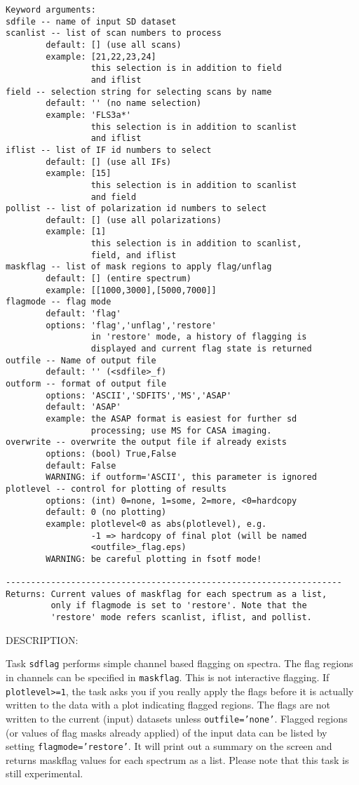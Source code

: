 \begin{verbatim}
Keyword arguments:
sdfile -- name of input SD dataset
scanlist -- list of scan numbers to process
        default: [] (use all scans)
        example: [21,22,23,24]
                 this selection is in addition to field
                 and iflist
field -- selection string for selecting scans by name
        default: '' (no name selection)
        example: 'FLS3a*'
                 this selection is in addition to scanlist
                 and iflist
iflist -- list of IF id numbers to select
        default: [] (use all IFs)
        example: [15]
                 this selection is in addition to scanlist
                 and field
pollist -- list of polarization id numbers to select
        default: [] (use all polarizations)
        example: [1]
                 this selection is in addition to scanlist,
                 field, and iflist
maskflag -- list of mask regions to apply flag/unflag 
        default: [] (entire spectrum)
        example: [[1000,3000],[5000,7000]]
flagmode -- flag mode
        default: 'flag'
        options: 'flag','unflag','restore'
                 in 'restore' mode, a history of flagging is 
                 displayed and current flag state is returned
outfile -- Name of output file
        default: '' (<sdfile>_f)
outform -- format of output file
        options: 'ASCII','SDFITS','MS','ASAP'
        default: 'ASAP'
        example: the ASAP format is easiest for further sd
                 processing; use MS for CASA imaging.
overwrite -- overwrite the output file if already exists
        options: (bool) True,False
        default: False
        WARNING: if outform='ASCII', this parameter is ignored 
plotlevel -- control for plotting of results
        options: (int) 0=none, 1=some, 2=more, <0=hardcopy
        default: 0 (no plotting)
        example: plotlevel<0 as abs(plotlevel), e.g.
                 -1 => hardcopy of final plot (will be named
                 <outfile>_flag.eps)
        WARNING: be careful plotting in fsotf mode!

-------------------------------------------------------------------
Returns: Current values of maskflag for each spectrum as a list, 
         only if flagmode is set to 'restore'. Note that the 
         'restore' mode refers scanlist, iflist, and pollist.

\end{verbatim}

    DESCRIPTION:

    Task {\tt sdflag} performs simple channel based flagging on spectra.
    The flag regions in channels can be specified in {\tt maskflag}. This
    is not interactive flagging. If {\tt plotlevel>=1}, the task asks 
    you if you really apply the flags before it is actually written to the data 
    with a plot indicating flagged regions. The flags
    are not written to the current (input) datasets unless {\tt outfile='none'}.
    Flagged regions (or values of flag masks already applied) of the input data 
    can be listed by setting {\tt flagmode='restore'}. It will print out a summary on
    the screen and returns maskflag values for each spectrum as a list.
    Please note that this task is still experimental.

